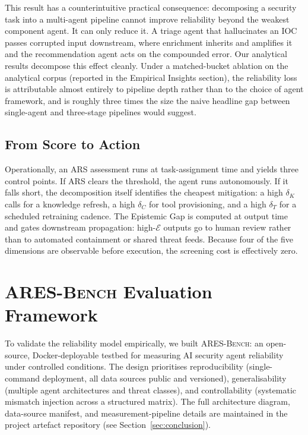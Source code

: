 \documentclass[journal,compsoc]{IEEEtran}
\newcommand{\ARESBench}{\textsc{ARES-Bench}}
\begin{document}
This result has a counterintuitive practical consequence: decomposing
a security task into a multi-agent pipeline cannot improve reliability
beyond the weakest component agent. It can only reduce it. A triage agent
that hallucinates an IOC passes corrupted input downstream, where
enrichment inherits and amplifies it and the recommendation agent acts
on the compounded error. Our analytical results decompose this effect
cleanly. Under a matched-bucket ablation on the analytical corpus
(reported in the Empirical Insights section),
the reliability loss is attributable almost entirely to pipeline depth
rather than to the choice of agent framework, and is roughly three
times the size the naive headline gap between single-agent and
three-stage pipelines would suggest.

\subsection{From Score to Action}

Operationally, an ARS assessment runs at task-assignment time and
yields three control points. If ARS clears the threshold, the agent
runs autonomously. If it falls short, the decomposition itself
identifies the cheapest mitigation: a high $\delta_K$ calls for a
knowledge refresh, a high $\delta_C$ for tool provisioning, and a
high $\delta_T$ for a scheduled retraining cadence. The Epistemic
Gap is computed at output time and gates downstream propagation:
high-$\mathcal{E}$ outputs go to human review rather than to
automated containment or shared threat feeds. Because four of the
five dimensions are observable before execution, the screening cost
is effectively zero.

\section{\ARESBench{} Evaluation Framework}
\label{sec:aresbench}

To validate the reliability model empirically, we built
\ARESBench{}: an open-source, Docker-deployable testbed for measuring
AI security agent reliability under controlled conditions. The design
prioritises reproducibility (single-command deployment, all data
sources public and versioned), generalisability (multiple agent
architectures and threat classes), and controllability (systematic
mismatch injection across a structured matrix). The full architecture
diagram, data-source manifest, and measurement-pipeline details are
maintained in the project artefact repository (see Section~\ref{sec:conclusion}).
\end{document}
